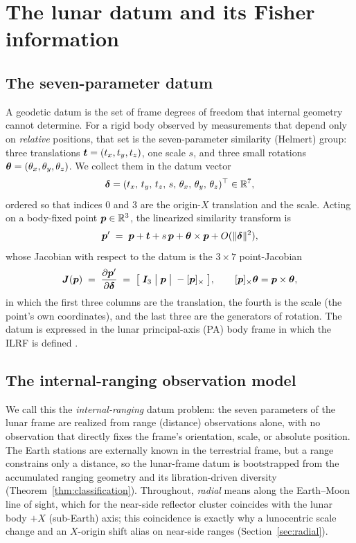 \section{The lunar datum and its Fisher information}
\label{sec:setup}

\subsection{The seven-parameter datum}

A geodetic datum is the set of frame degrees of freedom that internal geometry
cannot determine. For a rigid body observed by measurements that depend only on
\emph{relative} positions, that set is the seven-parameter similarity (Helmert)
group: three translations $\bm{t}=(t_x,t_y,t_z)$, one scale $s$, and three
small rotations $\bm{\theta}=(\theta_x,\theta_y,\theta_z)$. We collect them in the datum
vector
\begin{equation}
  \bm{\delta} = (t_x,\,t_y,\,t_z,\,s,\,\theta_x,\,\theta_y,\,\theta_z)^\top \in \mathbb{R}^7,
  \label{eq:datumvec}
\end{equation}
ordered so that indices $0$ and $3$ are the origin-$X$ translation and the scale.
Acting on a body-fixed point $\bm{p}\in\mathbb{R}^3$, the linearized similarity transform is
\begin{equation}
  \bm{p}' \;=\; \bm{p} + \bm{t} + s\,\bm{p} + \bm{\theta}\times\bm{p} + O(\|\bm{\delta}\|^2),
  \label{eq:helmert}
\end{equation}
whose Jacobian with respect to the datum is the $3\times7$ point-Jacobian
\begin{equation}
  \bm{J}(\bm{p}) \;=\;
  \frac{\partial \bm{p}'}{\partial \bm{\delta}}
  \;=\;
  \bigl[\; \bm{I}_3 \;\big|\; \bm{p} \;\big|\; -[\bm{p}]_\times \;\bigr],
  \qquad
  [\bm{p}]_\times \bm{\theta} = \bm{p}\times\bm{\theta},
  \label{eq:pointjac}
\end{equation}
in which the first three columns are the translation, the fourth is the scale
(the point's own coordinates), and the last three are the generators of rotation.
The datum is expressed in the lunar principal-axis (PA) body frame in which the
ILRF is defined \citep{sosnica2025ilrf,archinal2018iau}.

\subsection{The internal-ranging observation model}
\label{sec:obsmodel}

We call this the \emph{internal-ranging} datum problem: the seven parameters of the
lunar frame are realized from range (distance) observations alone, with no
observation that directly fixes the frame's orientation, scale, or absolute
position. The Earth stations are externally known in the terrestrial frame, but a
range constrains only a distance, so the lunar-frame datum is bootstrapped from the
accumulated ranging geometry and its libration-driven diversity
(Theorem~\ref{thm:classification}). Throughout, \emph{radial} means along the
Earth--Moon line of sight, which for the near-side reflector cluster coincides with
the lunar body $+X$ (sub-Earth) axis; this coincidence is exactly why a lunocentric
scale change and an $X$-origin shift alias on near-side ranges
(Section~\ref{sec:radial}).

